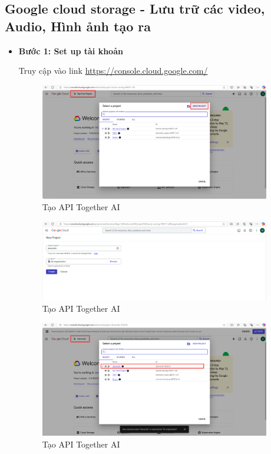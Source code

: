 \subsection{Google cloud storage - Lưu trữ các video, Audio, Hình ảnh tạo ra}
\begin{itemize}[label=]
    \item \textbf{Bước 1: Set up tài khoản} 
    
    Truy cập vào link \url{https://console.cloud.google.com/} \\ 

    \begin{figure}[H]
    \centering
    \includegraphics[width=0.95\textwidth]{images/GGcloud.png}
    \caption{Tạo API Together AI}
    
    \end{figure}
    \begin{figure}[H]
    \centering
    \includegraphics[width=0.95\textwidth]{images/GGcloud-1.png}
    \caption{Tạo API Together AI}
    
    \end{figure}
    
    \begin{figure}[H]
    \centering
    \includegraphics[width=0.95\textwidth]{images/GGcloud-2.png}
    \caption{Tạo API Together AI}
    

\end{figure}
\end{itemize}
